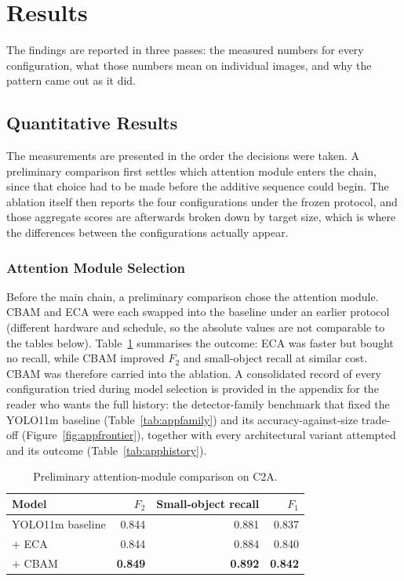 \documentclass[12pt,a4paper,oneside]{report}
\begin{document}
\section{Results}
\label{sec:results}
The findings are reported in three passes: the measured numbers for every
configuration, what those numbers mean on individual images, and why the
pattern came out as it did.

\subsection{Quantitative Results}
\label{sec:quant}

The measurements are presented in the order the decisions were taken. A
preliminary comparison first settles which attention module enters the chain,
since that choice had to be made before the additive sequence could begin. The
ablation itself then reports the four configurations under the frozen protocol,
and those aggregate scores are afterwards broken down by target size, which is
where the differences between the configurations actually appear.

\subsubsection{Attention Module Selection}
Before the main chain, a preliminary comparison chose the attention module.
CBAM and ECA were each swapped into the baseline under an earlier protocol
(different hardware and schedule, so the absolute values are not comparable
to the tables below). Table~\ref{tab:eca} summarises the outcome: ECA was
faster but bought no recall, while CBAM improved $F_2$ and small-object
recall at similar cost. CBAM was therefore carried into the ablation. A
consolidated record of every configuration tried during model selection is
provided in the appendix for the reader who wants the full history: the
detector-family benchmark that fixed the YOLO11m baseline
(Table~\ref{tab:appfamily}) and its accuracy-against-size trade-off
(Figure~\ref{fig:appfrontier}), together with every architectural variant
attempted and its outcome (Table~\ref{tab:apphistory}).

\begin{table}[tbp]
  \centering
  \caption{Preliminary attention-module comparison on C2A.}
  \label{tab:eca}
  \begin{tabular}{|l|r|r|r|}
    \hline
    Model & $F_2$ & Small-object recall & $F_1$ \\
    \hline
    YOLO11m baseline & 0.844 & 0.881 & 0.837 \\ \hline
    + ECA            & 0.844 & 0.884 & 0.840 \\ \hline
    + CBAM           & \textbf{0.849} & \textbf{0.892} & \textbf{0.842} \\
    \hline
  \end{tabular}
\end{table}
\end{document}
